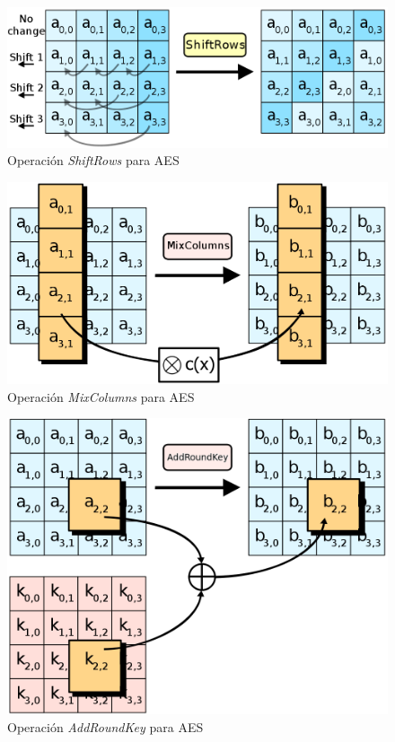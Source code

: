 \begin{figure}[ht]
  \centering
  \includegraphics[scale=0.4]{Figures/ShiftRows}
  \decoRule
  \caption[\emph{ShiftRows} (AES)]{Operación \emph{ShiftRows} para AES \emph{\parencite{Reference28}}}
  \label{fig:ShiftRows}
\end{figure}

\begin{figure}[ht]
  \centering
  \includegraphics[scale=0.25]{Figures/MixColumns}
  \decoRule
  \caption[\emph{MixColumns} (AES)]{Operación \emph{MixColumns} para AES \emph{\parencite{Reference29}}}
  \label{fig:MixColumns}
\end{figure}

\begin{figure}[ht]
  \centering
  \includegraphics[scale=0.4]{Figures/AddRoundKey}
  \decoRule
  \caption[\emph{AddRoundKey} (AES)]{Operación \emph{AddRoundKey} para AES \emph{\parencite{Reference30}}}
  \label{fig:AddRoundKey}
\end{figure}

